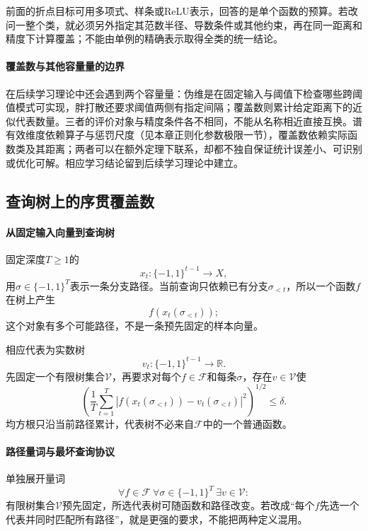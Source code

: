 前面的折点目标可用多项式、样条或ReLU表示，回答的是单个函数的预算。若改问一整个类，就必须另外指定其范数半径、导数条件或其他约束，再在同一距离和精度下计算覆盖；不能由单例的精确表示取得全类的统一结论。

\paragraph{覆盖数与其他容量量的边界}

在后续学习理论中还会遇到两个容量量：伪维是在固定输入与阈值下检查哪些跨阈值模式可实现，胖打散还要求阈值两侧有指定间隔；覆盖数则累计给定距离下的近似代表数量。三者的评价对象与精度条件各不相同，不能从名称相近直接互换。谱有效维度依赖算子与惩罚尺度（见本章正则化参数极限一节），覆盖数依赖实际函数类及其距离；两者可以在额外定理下联系，却都不独自保证统计误差小、可识别或优化可解。相应学习结论留到后续学习理论中建立。

\subsection{查询树上的序贯覆盖数}
\label{subsubsec:sequential-covering}

\paragraph{从固定输入向量到查询树}

固定深度$T\ge1$的
\[
  x_t:\{-1,1\}^{t-1}\to X,
\]
用$\sigma\in\{-1,1\}^{T}$表示一条分支路径。当前查询只依赖已有分支$\sigma_{<t}$，所以一个函数$f$在树上产生
\[
  f(x_t(\sigma_{<t}));
\]
这个对象有多个可能路径，不是一条预先固定的样本向量。

相应代表为实数树
\[
  v_t:\{-1,1\}^{t-1}\to\mathbb R.
\]
先固定一个有限树集合$\mathcal V$，再要求对每个$f\in\mathcal F$和每条$\sigma$，存在$v\in\mathcal V$使
\begin{equation}
  \left(\frac1T\sum_{t=1}^{T}
  \left|f(x_t(\sigma_{<t}))-v_t(\sigma_{<t})\right|^2\right)^{1/2}
  \le\delta.
  \label{eq:functional-sequential-cover}
\end{equation}
均方根只沿当前路径累计，代表树不必来自$\mathcal F$中的一个普通函数。

\paragraph{路径量词与最坏查询协议}

单独展开量词
\[
  \forall f\in\mathcal F\ \forall\sigma\in\{-1,1\}^T\ \exists v\in\mathcal V:
\]
有限树集合$\mathcal V$预先固定，所选代表树可随函数和路径改变。若改成“每个$f$先选一个代表并同时匹配所有路径”，就是更强的要求，不能把两种定义混用。


